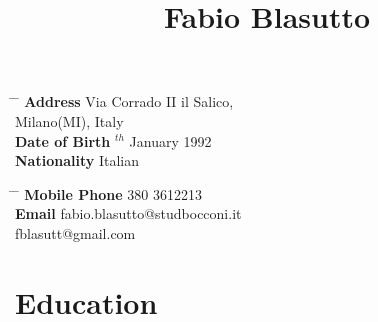 \documentclass[10pt]{article} %
\begin{document}

\title{Fabio Blasutto} %


\pagestyle{empty}
\parbox{0.5\textwidth}{ %
\begin{tabbing} %
\hspace{3cm} \= \hspace{4cm} \= \kill %
{\bf Address} \> Via Corrado II il Salico,\\ %
\> Milano(MI), Italy\\ %
{\bf Date of Birth} $^{th}$ January 1992 \\ %
{\bf Nationality} \> Italian %
\end{tabbing}}
\hfill %
\parbox{0.5\textwidth}{ %
\begin{tabbing} %
\hspace{3cm} \= \hspace{4cm} \= \kill %
{\bf Mobile Phone}  380 3612213 \\ %
{\bf Email} \> fabio.blasutto@studbocconi.it \\ 
\> fblasutt@gmail.com%
\end{tabbing}}


\section{Education}

\end{document}
